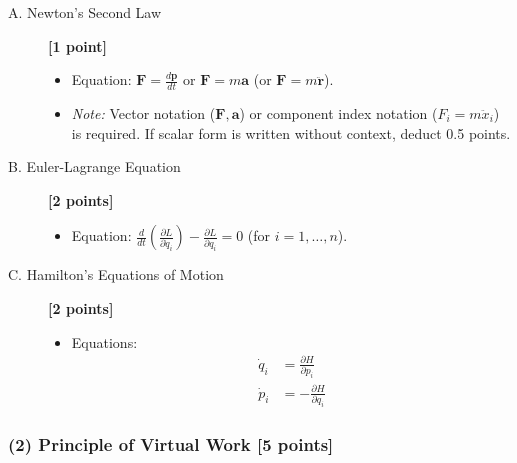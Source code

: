 \documentclass[11pt, a4paper]{article} %
\begin{document}
\begin{description}
    \item[A. Newton's Second Law] \hfill \textbf{[1 point]}
    \begin{itemize}
        \item Equation: $\mathbf{F} = \frac{d\mathbf{p}}{dt}$ or $\mathbf{F} = m\mathbf{a}$ (or $\mathbf{F} = m\ddot{\mathbf{r}}$).
        \item \textit{Note:} Vector notation ($\mathbf{F}, \mathbf{a}$) or component index notation ($F_i = m \ddot{x}_i$) is required. If scalar form is written without context, deduct 0.5 points.
    \end{itemize}

    \item[B. Euler-Lagrange Equation] \hfill \textbf{[2 points]}
    \begin{itemize}
        \item Equation: $\frac{d}{dt}\left(\frac{\partial L}{\partial \dot{q}_i}\right) - \frac{\partial L}{\partial q_i} = 0$ (for $i = 1, \dots, n$).
    \end{itemize}

    \item[C. Hamilton's Equations of Motion] \hfill \textbf{[2 points]}
    \begin{itemize}
        \item Equations: 
        \begin{align*}
            \dot{q}_i &= \frac{\partial H}{\partial p_i} \\
            \dot{p}_i &= -\frac{\partial H}{\partial q_i}
        \end{align*}
    \end{itemize}
\end{description}

\subsubsection*{(2) Principle of Virtual Work [5 points]}
\end{document}
